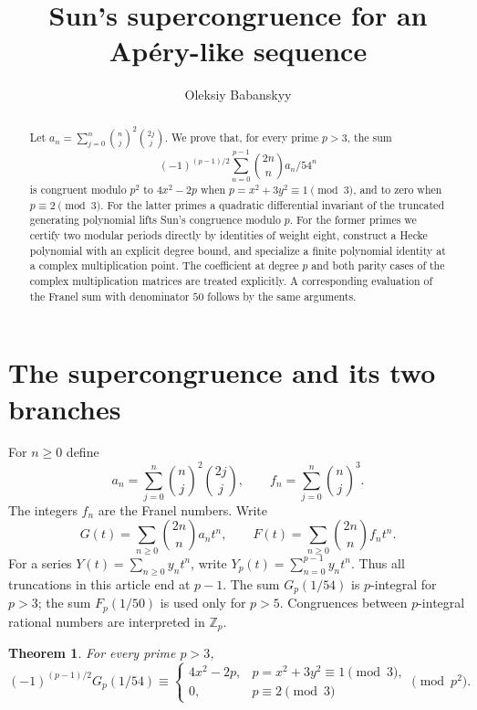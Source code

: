 \documentclass[11pt,a4paper]{article}
\title{Sun's supercongruence for an Ap\'ery-like sequence}
\author{Oleksiy Babanskyy}
\date{}
\newtheorem{theorem}{Theorem}[section]
\theoremstyle{remark}\newtheorem{remark}[theorem]{Remark}
\newcommand{\Z}{\mathbb Z}\newcommand{\Q}{\mathbb Q}
\begin{document}
\maketitle
\begin{abstract}
Let $a_n=\sum_{j=0}^n\binom nj^2\binom{2j}j$.
We prove that, for every prime $p>3$, the sum
\[
 (-1)^{(p-1)/2}\sum_{n=0}^{p-1}\binom{2n}n a_n/54^n
\]
is congruent modulo $p^2$ to $4x^2-2p$ when
$p=x^2+3y^2\equiv1\pmod3$, and to zero when $p\equiv2\pmod3$.
For the latter primes a quadratic differential invariant of the truncated
generating polynomial lifts Sun's congruence modulo $p$.
For the former primes we certify two modular periods directly by identities
of weight eight, construct a Hecke polynomial with an explicit degree bound,
and specialize a finite polynomial identity at a complex multiplication point.
The coefficient at degree $p$ and both parity cases of the complex
multiplication matrices are treated explicitly. A corresponding evaluation
of the Franel sum with denominator $50$ follows by the same arguments.
\end{abstract}

\section{The supercongruence and its two branches}\label{sec:intro}
For $n\ge0$ define
\begin{equation}\label{eq:sequences}
 a_n=\sum_{j=0}^n\binom nj^2\binom{2j}j,
 \qquad f_n=\sum_{j=0}^n\binom nj^3.
\end{equation}
The integers $f_n$ are the Franel numbers. Write
\begin{equation}\label{eq:sums}
 G(t)=\sum_{n\ge0}\binom{2n}n a_nt^n,
 \qquad F(t)=\sum_{n\ge0}\binom{2n}n f_nt^n.
\end{equation}
For a series $Y(t)=\sum_{n\ge0}y_nt^n$, write
$Y_p(t)=\sum_{n=0}^{p-1}y_nt^n$.
Thus all truncations in this article end at $p-1$.
The sum $G_p(1/54)$ is $p$-integral for $p>3$;
the sum $F_p(1/50)$ is used only for $p>5$.
Congruences between $p$-integral rational numbers are interpreted in $\Z_p$.

\begin{theorem}\label{thm:main}
For every prime $p>3$,
\begin{equation}\label{eq:main}
 (-1)^{(p-1)/2} G_p(1/54)\equiv
 \begin{cases}
 4x^2-2p,&p=x^2+3y^2\equiv1\pmod3,\\
 0,&p\equiv2\pmod3
 \end{cases}
 \pmod{p^2}.
\end{equation}
\end{theorem}
\end{document}
